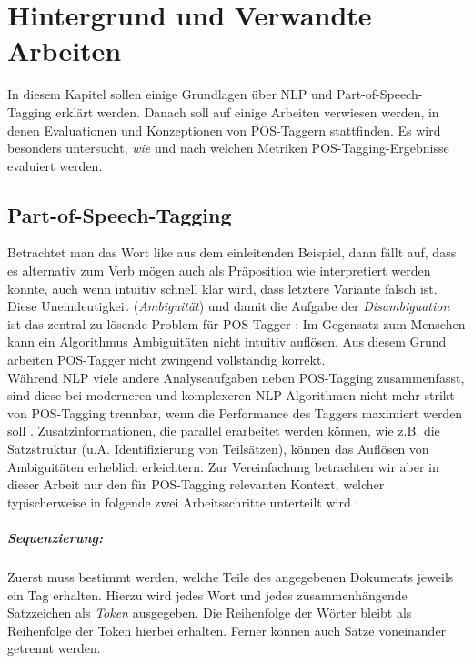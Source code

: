 %
\chapter{Hintergrund und Verwandte Arbeiten}
\label{sec:related}

In diesem Kapitel sollen einige Grundlagen über NLP und Part-of-Speech-Tagging erklärt werden. Danach soll auf einige Arbeiten verwiesen werden, in denen Evaluationen und Konzeptionen von POS-Taggern stattfinden. Es wird besonders untersucht, \textit{wie} und nach welchen Metriken POS-Tagging-Ergebnisse evaluiert werden.

\section{Part-of-Speech-Tagging}
\label{sec:related:pos}

Betrachtet man das Wort \glqq like\grqq{} aus dem einleitenden Beispiel, dann fällt auf, dass es alternativ zum Verb \glqq mögen\grqq{} auch als Präposition \glqq wie\grqq{} interpretiert werden könnte, auch wenn intuitiv schnell klar wird, dass letztere Variante falsch ist. Diese Uneindeutigkeit (\textit{Ambiguität}) und damit die Aufgabe der \textit{Disambiguation} ist das zentral zu lösende Problem für POS-Tagger  \cite{Smith} \cite{Jones}; Im Gegensatz zum Menschen kann ein Algorithmus Ambiguitäten nicht intuitiv auflösen. Aus diesem Grund arbeiten POS-Tagger nicht zwingend vollständig korrekt.
\\
Während NLP viele andere Analyseaufgaben neben POS-Tagging zusammenfasst, sind diese bei moderneren und komplexeren NLP-Algorithmen nicht mehr strikt von POS-Tagging trennbar, wenn die Performance des Taggers maximiert werden soll \cite{Smith}. Zusatzinformationen, die parallel erarbeitet werden können, wie z.B. die Satzstruktur (u.A. Identifizierung von Teilsätzen), können das Auflösen von Ambiguitäten erheblich erleichtern. Zur Vereinfachung betrachten wir aber in dieser Arbeit nur den für POS-Tagging relevanten Kontext, welcher typischerweise in folgende zwei Arbeitsschritte unterteilt wird \cite{Smith}:

\paragraph{Sequenzierung:} Zuerst muss bestimmt werden, welche Teile des angegebenen Dokuments jeweils ein Tag erhalten. Hierzu wird jedes Wort und jedes zusammenhängende Satzzeichen als \textit{Token} ausgegeben. Die Reihenfolge der Wörter bleibt als Reihenfolge der Token hierbei erhalten. Ferner können auch Sätze voneinander getrennt werden.
